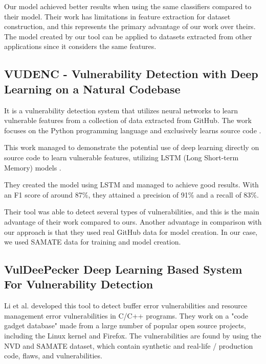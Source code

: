Our model achieved better results when using the same classifiers compared to their model. Their work has limitations in feature extraction for dataset construction, and this represents the primary advantage of our work over theirs. The model created by our tool can be applied to datasets extracted from other applications since it considers the same features.




\subsection{VUDENC - Vulnerability Detection with Deep Learning on a Natural Codebase} %
\label{sub:related_work_vudenc}

It is a vulnerability detection system that utilizes neural networks to learn vulnerable features from a collection of data extracted from GitHub. The work focuses on the Python programming language and exclusively learns source code \cite{Wartschinski2019}. 

This work managed to demonstrate the potential use of deep learning directly on source code to learn vulnerable features, utilizing LSTM (Long Short-term Memory) models \cite{article_LSTM}.

They created the model using LSTM and managed to achieve good results. With an F1 score of around 87\%, they attained a precision of 91\% and a recall of 83\%.

Their tool was able to detect several types of vulnerabilities, and this is the main advantage of their work compared to ours. Another advantage in comparison with our approach is that they used real GitHub data for model creation. In our case, we used SAMATE data for training and model creation.




\subsection{VulDeePecker Deep Learning Based System For Vulnerability Detection} %
\label{sub:related_work_VulDeePeckerADeep}

Li et al. \cite{Zhen_Li2018} developed this tool  to detect buffer error vulnerabilities and resource management error vulnerabilities in C/C++ programs. They work on a "code gadget database" made from a large number of popular open source projects, including the Linux kernel and Firefox. The vulnerabilities are found by using the NVD and SAMATE dataset, which contain synthetic and real-life / production code, flaws, and vulnerabilities.

